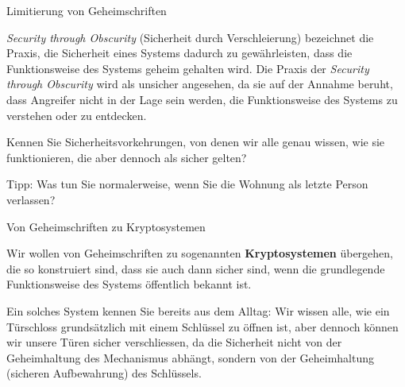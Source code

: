 \begin{frame}{Limitierung von Geheimschriften}
    \begin{myremark}
    \emph{Security through Obscurity} (Sicherheit durch Verschleierung) bezeichnet die Praxis, die Sicherheit eines Systems dadurch zu gewährleisten, dass die Funktionsweise des Systems geheim gehalten wird. 
    Die Praxis der \emph{Security through Obscurity} wird als unsicher angesehen, da sie auf der Annahme beruht, dass Angreifer nicht in der Lage sein werden, die Funktionsweise des Systems zu verstehen oder zu entdecken.
    \end{myremark}
\end{frame}


\begin{frame}
    \begin{center}
        Kennen Sie Sicherheitsvorkehrungen, von denen wir alle genau wissen, wie sie funktionieren, die aber dennoch als sicher gelten?
        \pause
        \par
        Tipp: Was tun Sie normalerweise, wenn Sie die Wohnung als letzte Person verlassen?
    \end{center}
\end{frame}


\begin{frame}{Von Geheimschriften zu Kryptosystemen}
    \begin{myidea}[Kryptosystem]
        Wir wollen von Geheimschriften zu sogenannten \textbf{Kryptosystemen} übergehen, die so konstruiert sind, dass sie auch dann sicher sind, wenn die grundlegende Funktionsweise des Systems öffentlich bekannt ist. 
        \par
        Ein solches System kennen Sie bereits aus dem Alltag: Wir wissen alle, wie ein Türschloss grundsätzlich mit einem Schlüssel zu öffnen ist, aber dennoch können wir unsere Türen sicher verschliessen, da die Sicherheit nicht von der Geheimhaltung des Mechanismus abhängt, sondern von der Geheimhaltung (sicheren Aufbewahrung) des Schlüssels.
    \end{myidea}
\end{frame}


